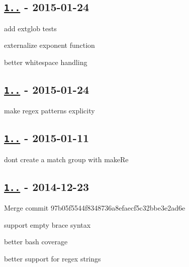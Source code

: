 \subsection*{\href{https://github.com/micromatch/braces/compare/1.3.0...1.4.0}{\tt 1..} -\/ 2015-\/01-\/24}


\begin{DoxyItemize}
\item add extglob tests
\item externalize exponent function
\item better whitespace handling
\end{DoxyItemize}

\subsection*{\href{https://github.com/micromatch/braces/compare/1.2.0...1.3.0}{\tt 1..} -\/ 2015-\/01-\/24}


\begin{DoxyItemize}
\item make regex patterns explicity
\end{DoxyItemize}

\subsection*{\href{https://github.com/micromatch/braces/compare/1.0.0...1.1.0}{\tt 1..} -\/ 2015-\/01-\/11}


\begin{DoxyItemize}
\item don\textquotesingle{}t create a match group with {\ttfamily make\+Re}
\end{DoxyItemize}

\subsection*{\href{https://github.com/micromatch/braces/compare/0.1.4...1.0.0}{\tt 1..} -\/ 2014-\/12-\/23}


\begin{DoxyItemize}
\item Merge commit \textquotesingle{}97b05f5544f8348736a8efaecf5c32bbe3e2ad6e\textquotesingle{}
\item support empty brace syntax
\item better bash coverage
\item better support for regex strings
\end{DoxyItemize}

